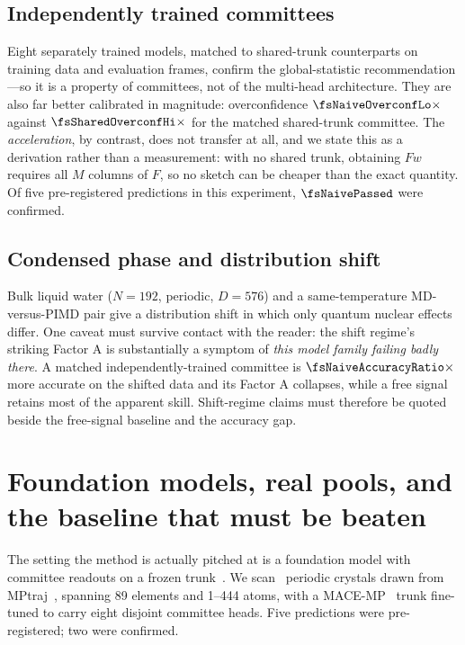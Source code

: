 \subsection{Independently trained committees}
Eight separately trained models, matched to shared-trunk counterparts on training
data and evaluation frames, confirm the global-statistic recommendation---so it is
a property of committees, not of the multi-head architecture. They are also far
better calibrated in magnitude: overconfidence $\fsNaiveOverconfLo\times$ against
$\fsSharedOverconfHi\times$ for the matched shared-trunk committee. The
\emph{acceleration}, by contrast, does not transfer at all, and we state this as a
derivation rather than a measurement: with no shared trunk, obtaining $Fw$
requires all $M$ columns of $F$, so no sketch can be cheaper than the exact
quantity. Of five pre-registered predictions in this experiment,
$\fsNaivePassed$ were confirmed.

\subsection{Condensed phase and distribution shift}
Bulk liquid water ($N=192$, periodic, $D=576$) and a same-temperature
MD-versus-PIMD pair give a distribution shift in which only quantum nuclear
effects differ. One caveat must survive contact with the reader: the shift
regime's striking Factor A is substantially a symptom of \emph{this model family
failing badly there}. A matched independently-trained committee is $\fsNaiveAccuracyRatio\times$
more accurate on the shifted data and its Factor A collapses, while a free signal
retains most of the apparent skill. Shift-regime claims must therefore be quoted
beside the free-signal baseline and the accuracy gap.

\section{Foundation models, real pools, and the baseline that must be beaten}
\label{sec:foundation}

The setting the method is actually pitched at is a foundation model with
committee readouts on a frozen trunk~\citep{batatia2023foundation}. We scan
\fsMPtrajN\ periodic crystals drawn from MPtraj~\citep{deng2023chgnet},
spanning 89 elements and 1--444 atoms, with a
MACE-MP~\citep{batatia2022mace} trunk fine-tuned to carry
eight disjoint committee heads. Five predictions were pre-registered; two were
confirmed.

